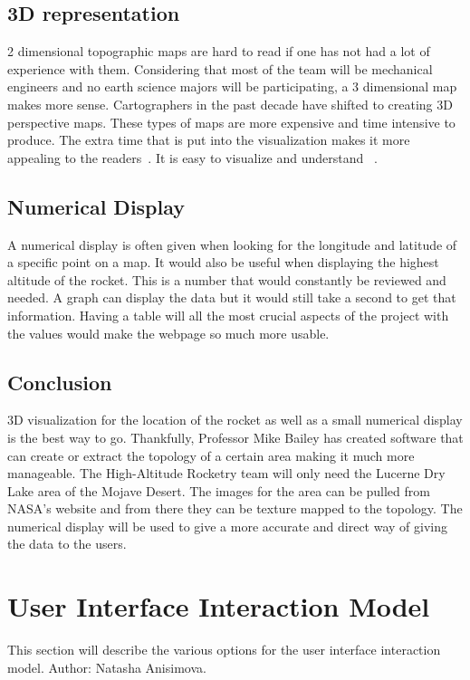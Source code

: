\documentclass[10pt,draftclsnofoot,onecolumn]{IEEEtran}
\begin{document}
	\subsection{3D representation}
	2 dimensional topographic maps are hard to read if one has not had a lot of experience with them. 
	Considering that most of the team will be mechanical engineers and no earth science majors will be participating, a 
	3 dimensional map makes more sense. 
	Cartographers in the past decade have shifted to creating 3D perspective maps. 
	These types of maps are more expensive and time intensive to produce. 
	The extra time that is put into the visualization makes it more appealing to the readers~\cite{evaluating-the-effectiveness-of-2d-vs-3d-trailhead-maps}. 
	It is easy to visualize and understand ~\cite{3d-represenation-for-software-visualization}.
	
	\subsection{Numerical Display}
	A numerical display is often given when looking for the longitude and latitude of a specific point on a map. 
	It would also be useful when displaying the highest altitude of the rocket. 
	This is a number that would constantly be reviewed and needed. 
	A graph can display the data but it would still take a second to get that information. 
	Having a table will all the most crucial aspects of the project with the values would make the webpage so much more usable.
	
	\subsection{Conclusion}
	3D visualization for the location of the rocket as well as a small numerical display is the best way to go. 
	Thankfully, Professor Mike Bailey has created software that can create or extract the topology of a certain area 
	making it much more manageable. 
	The High-Altitude Rocketry team will only need the Lucerne Dry Lake area of the Mojave Desert. 
	The images for the area can be pulled from NASA’s website and from there they can be texture mapped to the topology. 
	The numerical display will be used to give a more accurate and direct way of giving the data to the users. 
	
	\section{User Interface Interaction Model}
	This section will describe the various options for the user interface interaction model. Author: Natasha Anisimova.
	
\end{document}
